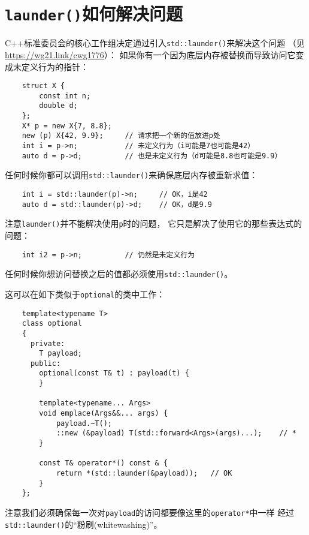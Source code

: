\section{\texttt{launder()}如何解决问题}
C++标准委员会的核心工作组决定通过引入\texttt{std::launder()}来解决这个问题
（见\url{https://wg21.link/cwg1776}）：
如果你有一个因为底层内存被替换而导致访问它变成未定义行为的指针：
\begin{lstlisting}
    struct X {
        const int n;
        double d;
    };
    X* p = new X{7, 8.8};
    new (p) X{42, 9.9};     // 请求把一个新的值放进p处
    int i = p->n;           // 未定义行为（i可能是7也可能是42）
    auto d = p->d;          // 也是未定义行为（d可能是8.8也可能是9.9）
\end{lstlisting}
任何时候你都可以调用\texttt{std::launder()}来确保底层内存被重新求值：
\begin{lstlisting}
    int i = std::launder(p)->n;     // OK，i是42
    auto d = std::launder(p)->d;    // OK，d是9.9
\end{lstlisting}
注意\texttt{launder()}并不能解决使用\texttt{p}时的问题，
它只是解决了使用它的那些表达式的问题：
\begin{lstlisting}
    int i2 = p->n;          // 仍然是未定义行为
\end{lstlisting}
任何时候你想访问替换之后的值都必须使用\texttt{std::launder()}。

这可以在如下类似于\texttt{optional}的类中工作：
\begin{lstlisting}
    template<typename T>
    class optional
    {
      private:
        T payload;
      public:
        optional(const T& t) : payload(t) {
        }

        template<typename... Args>
        void emplace(Args&&... args) {
            payload.~T();
            ::new (&payload) T(std::forward<Args>(args)...);    // *
        }

        const T& operator*() const & {
            return *(std::launder(&payload));   // OK
        }
    };
\end{lstlisting}
注意我们必须确保每一次对\texttt{payload}的访问都要像这里的\texttt{operator*}中一样
经过\texttt{std::launder()}的“粉刷(whitewashing)”。


